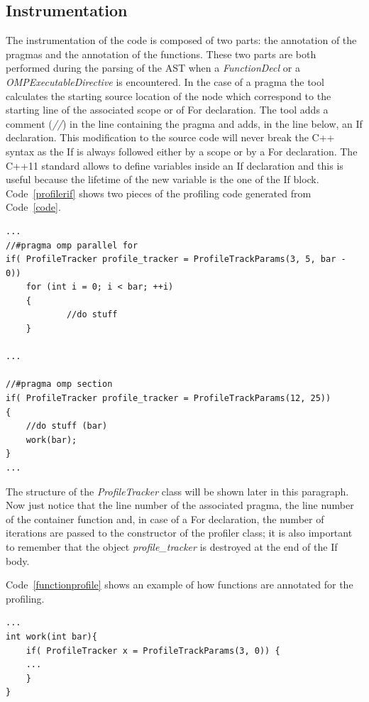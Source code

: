 \documentclass[a4paper,11pt,oneside]{book}
\begin{document}
\subsection{Instrumentation}
The instrumentation of the code is composed of two parts: the annotation of the pragmas and the annotation of the functions. These two parts are both performed during the parsing of the AST when a \emph{FunctionDecl} or a \emph{OMPExecutableDirective} is encountered. In the case of a pragma the tool calculates the starting source location of the node which correspond to the starting line of the associated scope or of For declaration. The tool adds a comment (\emph{//}) in the line containing the pragma and adds, in the line below,  an If declaration.  This modification to the source code will never break the C++ syntax as the If is always followed either by a scope or by a For declaration. The C++11 standard allows to define variables inside an If declaration and this is useful because the lifetime of the new variable is the one of the If block. Code~\ref{profilerif} shows two pieces of the profiling code generated from Code~\ref{code}.

\begin{lstlisting}[language=CCC, caption=Parts of the profiling code generated from Code~\ref{code}., label=profilerif]
...
//#pragma omp parallel for
if( ProfileTracker profile_tracker = ProfileTrackParams(3, 5, bar - 0))
	for (int i = 0; i < bar; ++i)
	{
    		//do stuff
	}
  
...

//#pragma omp section
if( ProfileTracker profile_tracker = ProfileTrackParams(12, 25))
{
    //do stuff (bar)
    work(bar);
}
...
\end{lstlisting}

The structure of the \emph{ProfileTracker} class will be shown later in this paragraph. Now just notice that the line number of the associated pragma, the line number of the container function and, in case of a For declaration, the number of iterations are passed to the constructor of the profiler class; it is also important to remember that the object \emph{profile\_tracker} is destroyed at the end of the If body. 

Code~\ref{functionprofile} shows an example of how functions are annotated for the profiling. 

\begin{lstlisting}[language=CCC, caption=Example of a profiled function from Code~\ref{code}., label=functionprofile ]
...
int work(int bar){
	if( ProfileTracker x = ProfileTrackParams(3, 0)) {
	...
	}
}
\end{lstlisting}
\end{document}
